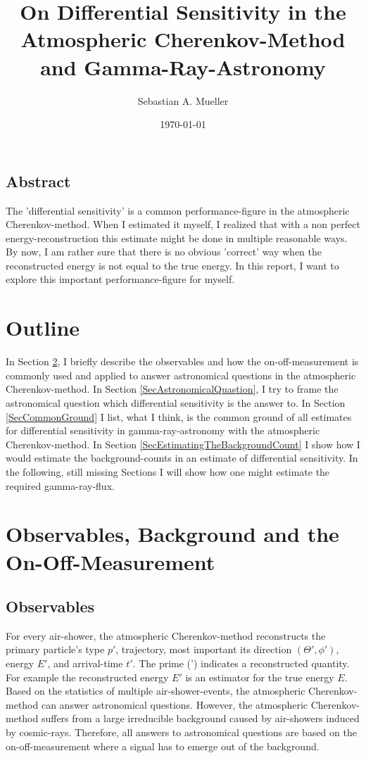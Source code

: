 \documentclass{article}%
\title{
    On Differential Sensitivity in the Atmospheric Cherenkov-Method and Gamma-Ray-Astronomy
}%
\author{Sebastian A. Mueller}%
\date{\today{}}%
\begin{document}
%
\maketitle%
%
\newcommand{\dd}[2]{\frac{\mathrm{d}#1}{\mathrm{d}#2}}
%
\subsection*{Abstract}
The 'differential sensitivity' is a common performance-figure in the atmospheric Cherenkov-method.
%
When I estimated it myself, I realized that with a non perfect energy-reconstruction this estimate might be done in multiple reasonable ways.
%
By now, I am rather sure that there is no obvious 'correct' way when the reconstructed energy is not equal to the true energy.
%
In this report, I want to explore this important performance-figure for myself.
%
\section{Outline}
%
In Section \ref{SecObservablesAndOnOff}, I briefly describe the observables and how the on-off-measurement is commonly used and applied to answer astronomical questions in the atmospheric Cherenkov-method.
%
In Section \ref{SecAstronomicalQuastion}, I try to frame the astronomical question which differential sensitivity is the answer to.
%
In Section \ref{SecCommonGround} I list, what I think, is the common ground of all estimates for differential sensitivity in gamma-ray-astronomy with the atmospheric Cherenkov-method.
%
In Section \ref{SecEstimatingTheBackgroundCount} I show how I would estimate the background-counts in an estimate of differential sensitivity.
%
In the following, still missing Sections I will show how one might estimate the required gamma-ray-flux.
%
\section{Observables, Background and the On-Off-Measurement}
\label{SecObservablesAndOnOff}
\subsection*{Observables}
%
For every air-shower, the atmospheric Cherenkov-method reconstructs the primary particle's type $p'$, trajectory, most important its direction $(\Theta', \phi')$, energy $E'$, and arrival-time $t'$.
%
The prime (') indicates a reconstructed quantity. For example the reconstructed energy $E'$ is an estimator for the true energy $E$.
%
Based on the statistics of multiple air-shower-events, the atmospheric Cherenkov-method can answer astronomical questions.
%
However, the atmospheric Cherenkov-method suffers from a large irreducible background caused by air-showers induced by cosmic-rays.
%
Therefore, all answers to astronomical questions are based on the on-off-measurement where a signal has to emerge out of the background.
%
\end{document}
